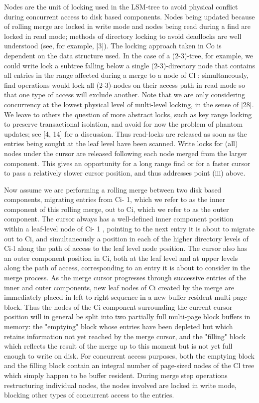 \documentclass[a4paper,11pt,notitlepage,twoside,openright]{article}
\begin{document}
Nodes are the unit of locking used in the LSM-tree to avoid physical
conflict during concurrent access to disk based components. Nodes being
updated because of rolling merge are locked in write mode and nodes
being read during a find are locked in read mode; methods of directory
locking to avoid deadlocks are well understood (see, for example,
{[}3{]}). The locking approach taken in Co is dependent on the data
structure used. In the case of a (2-3)-tree, for example, we could write
lock a subtree falling below a single (2-3)-directory node that contains
all entries in the range affected during a merge to a node of Cl ;
simultaneously, find operations would lock all (2-3)-nodes on their
access path in read mode so that one type of access will exclude
another. Note that we are only considering concurrency at the lowest
physical level of multi-level locking, in the sense of {[}28{]}. We
leave to others the question of more abstract locks, such as key range
locking to preserve transactional isolation, and avoid for now the
problem of phantom updates; see {[}4, 14{]} for a discussion. Thus
read-locks are released as soon as the entries being sought at the leaf
level have been scanned. Write locks for (all) nodes under the cursor
are released following each node merged from the larger component. This
gives an opportunity for a long range find or for a faster cursor to
pass a relatively slower cursor position, and thus addresses point (iii)
above.

Now assume we are performing a rolling merge between two disk based
components, migrating entries from Ci- 1, which we refer to as the inner
component of this rolling merge, out to Ci, which we refer to as the
outer component. The cursor always has a well-defined inner component
position within a leaf-level node of Ci- 1 , pointing to the next entry
it is about to migrate out to Ci, and simultaneously a position in each
of the higher directory levels of Ci-l along the path of access to the
leaf level node position. The cursor also has an outer component
position in Ci, both at the leaf level and at upper levels along the
path of access, corresponding to an entry it is about to consider in the
merge process. As the merge cursor progresses through successive entries
of the inner and outer components, new leaf nodes of Ci created by the
merge are immediately placed in left-to-right sequence in a new buffer
resident multi-page block. Thus the nodes of the Ci component
surrounding the current cursor position will in general be split into
two partially full multi-page block buffers in memory: the "emptying"
block whose entries have been depleted but which retains information not
yet reached by the merge cursor, and the "filling" block which reflects
the result of the merge up to this moment but is not yet full enough to
write on disk. For concurrent access purposes, both the emptying block
and the filling block contain an integral number of page-sized nodes of
the Cl tree which simply happen to be buffer resident. During merge step
operations restructuring individual nodes, the nodes involved are locked
in write mode, blocking other types of concurrent access to the entries.
\end{document}
